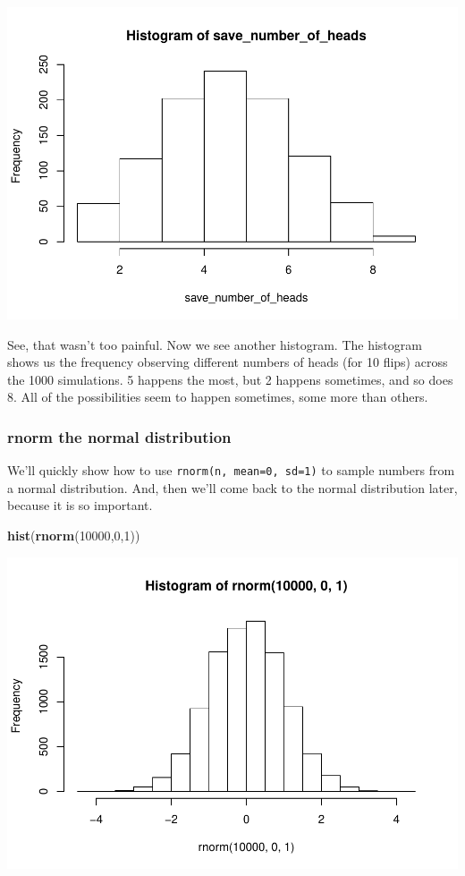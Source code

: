 \documentclass[]{book}
\newenvironment{Shaded}{\begin{snugshade}}{\end{snugshade}}
\newcommand{\KeywordTok}[1]{\textcolor[rgb]{0.13,0.29,0.53}{\textbf{#1}}}
\newcommand{\DecValTok}[1]{\textcolor[rgb]{0.00,0.00,0.81}{#1}}
\newcommand{\NormalTok}[1]{#1}
\begin{document}
\includegraphics{Statistics_Lab_files/figure-latex/unnamed-chunk-112-1.pdf}

See, that wasn't too painful. Now we see another histogram. The
histogram shows us the frequency observing different numbers of heads
(for 10 flips) across the 1000 simulations. 5 happens the most, but 2
happens sometimes, and so does 8. All of the possibilities seem to
happen sometimes, some more than others.

\subsubsection{rnorm the normal
distribution}\label{rnorm-the-normal-distribution}

We'll quickly show how to use \texttt{rnorm(n,\ mean=0,\ sd=1)} to
sample numbers from a normal distribution. And, then we'll come back to
the normal distribution later, because it is so important.

\begin{Shaded}
\begin{Highlighting}[]
\KeywordTok{hist}\NormalTok{(}\KeywordTok{rnorm}\NormalTok{(}\DecValTok{10000}\NormalTok{,}\DecValTok{0}\NormalTok{,}\DecValTok{1}\NormalTok{))}
\end{Highlighting}
\end{Shaded}

\includegraphics{Statistics_Lab_files/figure-latex/unnamed-chunk-113-1.pdf}
\end{document}
